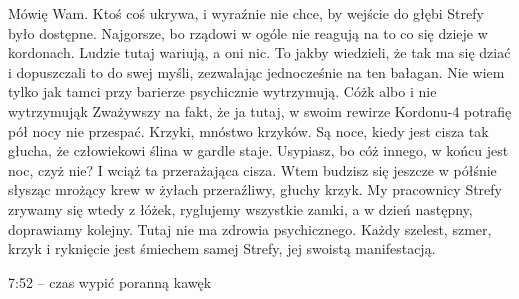 \documentclass[../MAIN.tex]{subfiles}
\begin{document}
Mówię Wam. Ktoś coś ukrywa, i wyraźnie nie chce, by wejście do
głębi Strefy było dostępne. Najgorsze, bo rządowi w ogóle nie
reagują na to co się dzieje w kordonach. Ludzie tutaj wariują,
a oni nic. To jakby wiedzieli, że tak ma się dziać i
dopuszczali to do swej myśli, zezwalając jednocześnie na ten
bałagan. Nie wiem tylko jak tamci przy barierze psychicznie
wytrzymują. Cóż\3k albo i nie wytrzymują\3k Zważywszy na fakt,
że ja tutaj, w swoim rewirze Kordonu-4 potrafię pół nocy nie
przespać. Krzyki, mnóstwo krzyków. Są noce, kiedy jest cisza
tak głucha, że człowiekowi ślina w gardle staje. Usypiasz, bo
cóż innego, w końcu jest noc, czyż nie? I wciąż ta
przerażająca cisza. Wtem budzisz się jeszcze w półśnie słysząc
mrożący krew w żyłach przeraźliwy, głuchy krzyk. My pracownicy
Strefy zrywamy się wtedy z łóżek, ryglujemy wszystkie zamki, a
w dzień następny, doprawiamy kolejny. Tutaj nie ma zdrowia
psychicznego. Każdy szelest, szmer, krzyk i ryknięcie jest
śmiechem samej Strefy, jej swoistą manifestacją.

7:52 – czas wypić poranną kawę\3k
\end{document}
